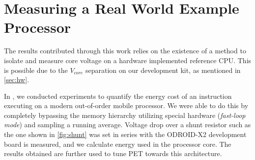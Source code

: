 \section{Measuring a Real World Example Processor}

The results contributed through this work relies on the existence of a method to
isolate and measure core voltage on a hardware implemented reference CPU. This
is possible due to the $V_{core}$ separation on our development kit, as
mentioned in \autoref{sec:hw}.

In \cite{rundehvatum2013exploring}, we conducted experiments to quantify the
energy cost of an instruction executing on a modern out-of-order mobile
processor. We were able to do this by completely bypassing the memory hierarchy
utilizing special hardware (\emph{fast-loop mode}) and sampling a running
average. Voltage drop over a shunt resistor such as the one shown in
\autoref{fig:shunt} was set in series with the ODROID-X2 development board is
measured, and we calculate energy used in the processor core. The results
obtained are further used to tune PET towards this architecture.
